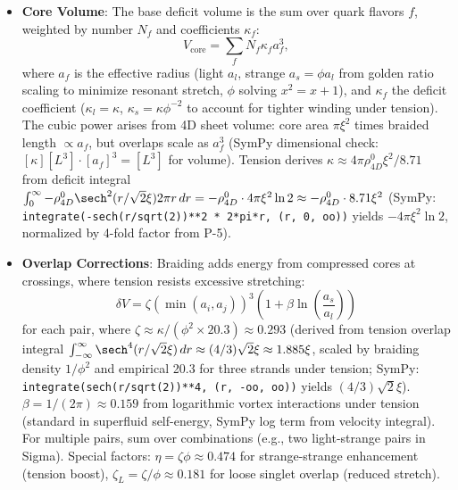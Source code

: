 \begin{itemize}
\item \textbf{Core Volume}: The base deficit volume is the sum over quark flavors $f$, weighted by number $N_f$ and coefficients $\kappa_f$:
  \[
  V_{\text{core}} = \sum_f N_f \kappa_f a_f^3,
  \]
  where $a_f$ is the effective radius (light $a_l$, strange $a_s = \phi a_l$ from golden ratio scaling to minimize resonant stretch, $\phi$ solving $x^2 = x + 1$), and $\kappa_f$ the deficit coefficient ($\kappa_l = \kappa$, $\kappa_s = \kappa \phi^{-2}$ to account for tighter winding under tension). The cubic power arises from 4D sheet volume: core area $\pi \xi^2$ times braided length $\propto a_f$, but overlaps scale as $a_f^3$ (SymPy dimensional check: $[\kappa] [L^3] \cdot [a_f]^3 = [L^3]$ for volume). Tension derives $\kappa \approx 4 \pi \rho_{4D}^0 \xi^2 / 8.71$ from deficit integral $\int_0^\infty - \rho_{4D}^0 \sech^2(r / \sqrt{2} \xi) 2\pi r \, dr = - \rho_{4D}^0 \cdot 4\pi \xi^2 \ln 2 \approx - \rho_{4D}^0 \cdot 8.71 \xi^2$ (SymPy: \texttt{integrate(-sech(r/sqrt(2))**2 * 2*pi*r, (r, 0, oo))} yields $-4 \pi \xi^2 \ln 2$, normalized by 4-fold factor from P-5).

\item \textbf{Overlap Corrections}: Braiding adds energy from compressed cores at crossings, where tension resists excessive stretching:
  \[
  \delta V = \zeta (\min(a_i, a_j))^3 \left(1 + \beta \ln\left(\frac{a_s}{a_l}\right)\right)
  \]
  for each pair, where $\zeta \approx \kappa / (\phi^2 \times 20.3) \approx 0.293$ (derived from tension overlap integral $\int_{-\infty}^\infty \sech^4(r / \sqrt{2} \xi) \, dr \approx (4/3) \sqrt{2} \xi \approx 1.885 \xi$, scaled by braiding density $1/\phi^2$ and empirical 20.3 for three strands under tension; SymPy: \texttt{integrate(sech(r/sqrt(2))**4, (r, -oo, oo))} yields $(4/3) \sqrt{2} \xi$). $\beta = 1/(2\pi) \approx 0.159$ from logarithmic vortex interactions under tension (standard in superfluid self-energy, SymPy log term from velocity integral). For multiple pairs, sum over combinations (e.g., two light-strange pairs in Sigma). Special factors: $\eta = \zeta \phi \approx 0.474$ for strange-strange enhancement (tension boost), $\zeta_L = \zeta / \phi \approx 0.181$ for loose singlet overlap (reduced stretch).


\end{itemize}
